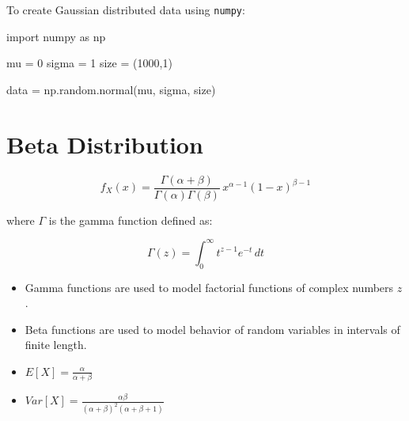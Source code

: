 \documentclass[
  letterpaper,
  DIV=11,
  numbers=noendperiod]{scrreprt}
\newenvironment{Shaded}{\begin{snugshade}}{\end{snugshade}}
\newcommand{\DecValTok}[1]{\textcolor[rgb]{0.68,0.00,0.00}{#1}}
\newcommand{\ImportTok}[1]{\textcolor[rgb]{0.00,0.46,0.62}{#1}}
\newcommand{\NormalTok}[1]{\textcolor[rgb]{0.00,0.23,0.31}{#1}}
\newcommand{\OperatorTok}[1]{\textcolor[rgb]{0.37,0.37,0.37}{#1}}
\providecommand{\tightlist}{%
  \setlength{\itemsep}{0pt}\setlength{\parskip}{0pt}}\usepackage{longtable,booktabs,array}
\begin{document}
To create Gaussian distributed data using \texttt{numpy}:

\begin{Shaded}
\begin{Highlighting}[]
\ImportTok{import}\NormalTok{ numpy }\ImportTok{as}\NormalTok{ np}

\NormalTok{mu }\OperatorTok{=} \DecValTok{0}
\NormalTok{sigma }\OperatorTok{=} \DecValTok{1}
\NormalTok{size }\OperatorTok{=}\NormalTok{ (}\DecValTok{1000}\NormalTok{,}\DecValTok{1}\NormalTok{)}

\NormalTok{data }\OperatorTok{=}\NormalTok{ np.random.normal(mu, sigma, size)}
\end{Highlighting}
\end{Shaded}

\section{Beta Distribution}\label{beta-distribution}

\[
f_{X}(x) = {\frac {\Gamma (\alpha +\beta )}{\Gamma (\alpha )\Gamma (\beta )}}\,x^{\alpha -1}(1-x)^{\beta -1}
\]

where \(\Gamma\) is the gamma function defined as:

\[
\Gamma (z)=\int _{0}^{\infty}t^{z-1}e^{-t}\,dt
\]

\begin{itemize}
\tightlist
\item
  Gamma functions are used to model factorial functions of complex
  numbers \(z\).
\item
  Beta functions are used to model behavior of random variables in
  intervals of finite length.
\item
  \(E[X] = \frac{\alpha}{\alpha+\beta}\)
\item
  \(Var[X] = \frac{\alpha\beta}{(\alpha+\beta)^2(\alpha+\beta+1)}\)
\end{itemize}
\end{document}
